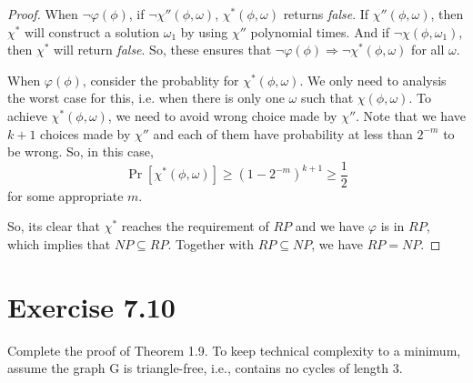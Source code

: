 \documentclass{article}
\begin{document}
\begin{proof}
  When $\lnot\varphi(\phi)$, if $\lnot\chi''(\phi, \omega)$, $\chi^*(\phi,\omega)$ returns \textit{false}.
  If $\chi''(\phi,\omega)$, then $\chi^*$ will construct a solution $\omega_1$ by using $\chi''$ polynomial times.
  And if $\lnot\chi(\phi,\omega_1)$, then $\chi^*$ will return \textit{false}.
  So, these ensures that $\lnot\varphi(\phi) \Rightarrow \lnot\chi^*(\phi, \omega)$ for all $\omega$.

  When $\varphi(\phi)$, consider the probablity for $\chi^*(\phi, \omega)$.
  We only need to analysis the worst case for this, i.e. when there is only one $\omega$ such that $\chi(\phi,\omega)$.
  To achieve $\chi^*(\phi,\omega)$, we need to avoid wrong choice made by $\chi''$.
  Note that we have $k+1$ choices made by $\chi''$ and each of them have probability at less than $2^{-m}$ to be wrong.
  So, in this case,
    \[\Pr[\chi^*(\phi, \omega)] \geq (1-2^{-m})^{k+1} \geq \frac{1}{2}\]
  for some appropriate $m$.

  So, its clear that $\chi^*$ reaches the requirement of $RP$ and we have $\varphi$ is in $RP$,
  which implies that $NP\subseteq RP$.
  Together with $RP\subseteq NP$, we have $RP = NP$.
\end{proof}

\section{Exercise 7.10}
Complete the proof of Theorem 1.9. To keep technical complexity to a minimum, assume the graph G is triangle-free, i.e., contains no cycles of length 3.
\end{document}
